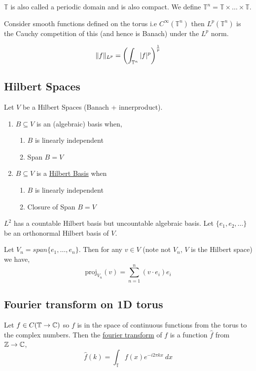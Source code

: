\vspace{1em}

$\mathbb{T}$ is also called a periodic domain and is also compact. We define $\mathbb{T}^{n} = \mathbb{T} \times \dots \times \mathbb{T}$.

\vspace{1em}

Consider smooth functions defined on the torus i.e $C^{\infty}(\mathbb{T}^{n})$ then $L^{p}(\mathbb{T}^{n})$ is the Cauchy competition of this (and hence is Banach) under the $L^{p}$ norm.


\[
  \lVert f\rVert_{L^{p}} = \left ( \int_{\mathbb{T}^{n}}^{} |f|^{p}\right )^{\frac{1}{p}}
\]

\subsection{Hilbert Spaces}
Let $V$ be a Hilbert Spaces (Banach + innerproduct). 

\begin{enumerate}
  \item $B \subseteq V$ is an (algebraic) basis when, 
    \begin{enumerate}
      \item $B$ is linearly independent
      \item Span $B = V$
  \end{enumerate}
\item $B \subseteq V$ is a \underline{Hilbert Basis} when
  \begin{enumerate}
    \item $B$ is linearly independent
    \item Closure of Span $ B = V$
  \end{enumerate}
\end{enumerate}

\begin{eg}
  $L^2$  has a countable Hilbert basis but uncountable algebraic basis. Let $\{e_{1}, e_{2}, \dots \}$ be an orthonormal Hilbert basis of $V$. 
\end{eg}
Let $V_n = span \{e_{1}, \dots, e_n\}$. Then for any $v \in V$ (note not $V_n$, $V$ is the Hilbert space) we have, 
\[
  \text{proj}_{V_n}(v) = \sum_{n = 1}^{n}  (v \cdot e_i) e_i
\]


\subsection{Fourier transform on 1D torus}
Let $f \in C(\mathbb{T} \to \mathbb{C})$ so $f$ is in the space of continuous functions from the torus to the complex numbers.  Then the \underline{fourier transform} of $f$ is a function $\hat{f}$ from $\mathbb{Z} \to \mathbb{C}$, 
\[
  \hat{f}(k) = \int_{\mathbb{T}}^{} f(x) e^{-i 2\pi k x}\ dx
\]

